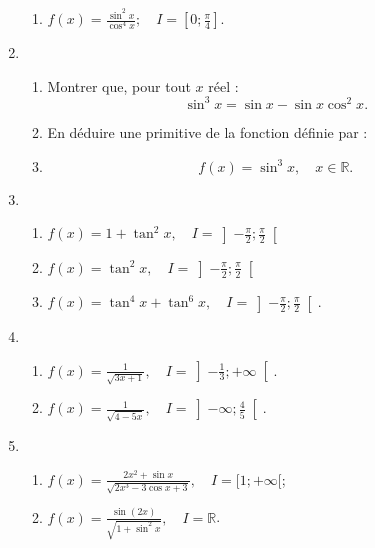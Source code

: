 \documentclass[12pt]{article}
\begin{document}
\begin{enumerate}
\begin{enumerate}
			\item \( f(x) = \frac{\sin^2 x}{\cos^4 x}; \quad I = \left[ 0; \frac{\pi}{4} \right] \).
		\end{enumerate}
		\item
		\begin{enumerate}
			\item Montrer que, pour tout \( x \) réel :
			\[\sin^3 x = \sin x - \sin x \cos^2 x.\]
			\item En déduire une primitive de la fonction définie par :
			\item \[f(x) = \sin^3 x, \quad x \in \mathbb{R}.\]
		\end{enumerate}
		\item
	\begin{enumerate}
		\item \( f(x) = 1 + \tan^2 x, \quad I = \left] - \frac{\pi}{2}; \frac{\pi}{2} \right[ \)
  	\item \( f(x) = \tan^2 x, \quad I = \left] - \frac{\pi}{2}; \frac{\pi}{2} \right[ \)
		\item \( f(x) = \tan^4 x + \tan^6 x, \quad I = \left] - \frac{\pi}{2}; \frac{\pi}{2} \right[ \).
	\end{enumerate}
	\item
	\begin{enumerate}
	\item \( f(x) = \frac{1}{\sqrt{3x + 1}}, \quad I = \left] -\frac{1}{3}; +\infty \right[ \).
	\item \( f(x) = \frac{1}{\sqrt{4 - 5x}}, \quad I = \left] -\infty; \frac{4}{5} \right[ \).
	\end{enumerate}
	\item
	\begin{enumerate}
	\item \( f(x) = \frac{2x^2 + \sin x}{\sqrt{2x^3 - 3 \cos x + 3}}, \quad I = [1; +\infty[ \);\\
	\item \( f(x) = \frac{\sin(2x)}{\sqrt{1 + \sin^2 x}}, \quad I = \mathbb{R} \).
	\end{enumerate}
\end{enumerate}
\end{document}
